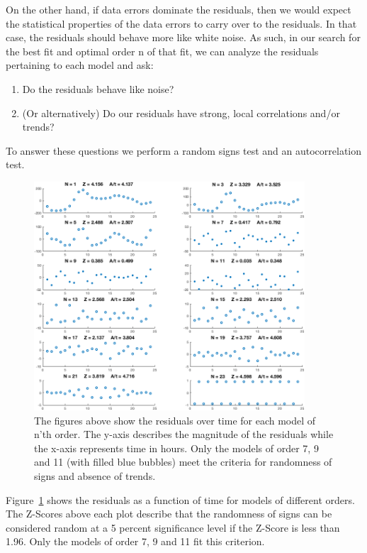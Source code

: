 \newpage
On the other hand, if data errors dominate the residuals, then we would expect the statistical properties of the data errors to carry over to the residuals. In that case, the residuals should behave more like white noise. As such, in our search for the best fit and optimal order n of that fit, we can analyze the residuals pertaining to each model and ask: 

\begin{enumerate}[label=\arabic*)]
\item Do the residuals behave like noise?
\item (Or alternatively) Do our residuals have strong, local correlations and/or trends?
\end{enumerate}

To answer these questions we perform a random signs test and an autocorrelation test.    

\begin{figure}[htbp]
\centering
\includegraphics[width=0.9\textwidth]{../img/figure2}
\caption{The figures above show the residuals over time for each model of n'th order. The y-axis describes the magnitude of the residuals while the x-axis represents time in hours. Only the models of order 7, 9 and 11 (with filled blue bubbles) meet the criteria for randomness of signs and absence of trends.}
\label{fig:figure2}
\end{figure}


Figure~\ref{fig:figure2} shows the residuals as a function of time for models of different orders. The Z-Scores above each plot describe that the randomness of signs can be considered random at a 5 percent significance level if the Z-Score is less than 1.96. Only the models of order 7, 9 and 11 fit this criterion.

